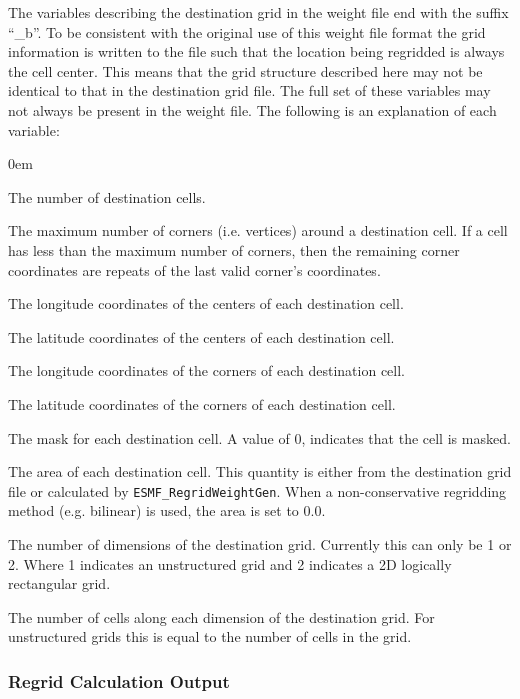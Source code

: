 The variables describing the destination grid in the weight file end with the suffix ``\_b''. To be consistent with the original use of this weight file format 
the grid information is written to the file such that the location being regridded is always the cell center. This means that the grid structure described here may not be identical to that in the destination grid file. The full set of these variables may not always be present in the weight file. The following is an 
explanation of each variable:
\begin{description}
  \itemsep0em
  \item[n\_b] The number of destination cells. 
  \item[nv\_b] The maximum number of corners (i.e. vertices)  around a destination cell. If a cell has less than the maximum number of corners, then the remaining corner coordinates are repeats of the last valid corner's coordinates.    
  \item[xc\_b] The longitude coordinates of the centers of each destination cell.  
  \item[yc\_b] The latitude coordinates of the centers of each destination cell.  
  \item[xv\_b] The longitude coordinates of the corners of each destination cell.  
  \item[yv\_b] The latitude coordinates of the corners of each destination cell.  
  \item[mask\_b] The mask for each destination cell. A value of 0, indicates that the cell is masked. 
  \item[area\_b] The area of each destination cell. This quantity is either from the destination grid file or calculated by {\tt ESMF\_RegridWeightGen}. When a non-conservative regridding method (e.g. bilinear) is used, the area is set to 0.0. 
 \item[dst\_grid\_rank] The number of dimensions of the destination grid. Currently this can only be 1 or 2. Where 1 indicates an unstructured grid and 2 indicates a 2D logically rectangular grid.
 \item[dst\_grid\_dims] The number of cells along each dimension of the destination grid. For unstructured grids this is equal to the number of cells in the grid. 
\end{description}

\subsubsection{Regrid Calculation Output}\label{regridoutput}

